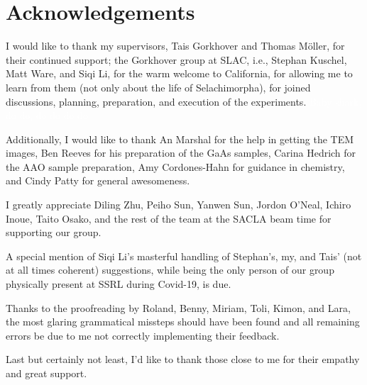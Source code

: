 \chapter*{Acknowledgements}
\onehalfspacing
I would like to thank my supervisors, Tais Gorkhover and Thomas Möller, for their continued support; the Gorkhover group at SLAC, i.e., Stephan Kuschel, Matt Ware, and Siqi Li, for the warm welcome to California, for allowing me to learn from them (not only about the life of Selachimorpha), for joined discussions, planning, preparation, and execution of the experiments. \textcolor{white}{Baby shark, do do, do do do do}

Additionally, I would like to thank An Marshal for the help in getting the TEM images, Ben Reeves for his preparation of the GaAs samples, Carina Hedrich for the AAO sample preparation, Amy Cordones-Hahn for guidance in chemistry, and Cindy Patty for general awesomeness.

I greatly appreciate Diling Zhu, Peiho Sun, Yanwen Sun, Jordon O'Neal, Ichiro Inoue, Taito Osako, and the rest of the team at the SACLA beam time for supporting our group. 

A special mention of Siqi Li's masterful handling of Stephan's, my, and Tais' (not at all times coherent) suggestions, while being the only person of our group physically present at SSRL during Covid-19, is due.

Thanks to the proofreading by Roland, Benny, Miriam, Toli, Kimon, and Lara, the most glaring grammatical missteps should have been found and all remaining errors be due to me not correctly implementing their feedback. 

Last but certainly not least, I'd like to thank those close to me for their empathy and great support.